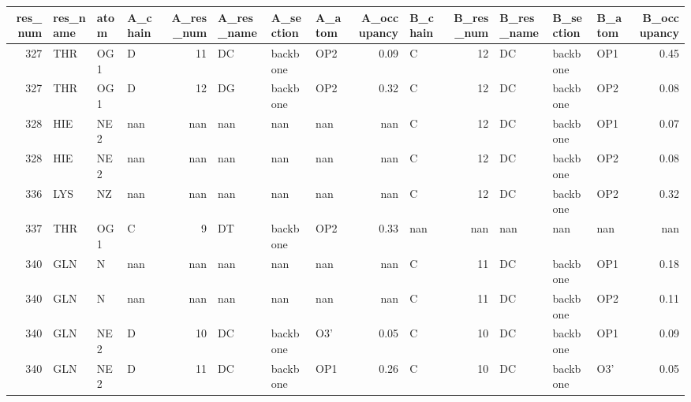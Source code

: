 \begin{longtable}{rlllrlllrlrlllr}
\hline
   res\_num & res\_name   & atom   & A\_chain   &   A\_res\_num & A\_res\_name   & A\_section   & A\_atom   &   A\_occupancy & B\_chain   &   B\_res\_num & B\_res\_name   & B\_section   & B\_atom   &   B\_occupancy \\
\hline
\endhead
       327 & THR        & OG1    & D         &          11 & DC           & backbone    & OP2      &          0.09 & C         &          12 & DC           & backbone    & OP1      &          0.45 \\
       327 & THR        & OG1    & D         &          12 & DG           & backbone    & OP2      &          0.32 & C         &          12 & DC           & backbone    & OP2      &          0.08 \\
       328 & HIE        & NE2    & nan       &         nan & nan          & nan         & nan      &        nan    & C         &          12 & DC           & backbone    & OP1      &          0.07 \\
       328 & HIE        & NE2    & nan       &         nan & nan          & nan         & nan      &        nan    & C         &          12 & DC           & backbone    & OP2      &          0.08 \\
       336 & LYS        & NZ     & nan       &         nan & nan          & nan         & nan      &        nan    & C         &          12 & DC           & backbone    & OP2      &          0.32 \\
       337 & THR        & OG1    & C         &           9 & DT           & backbone    & OP2      &          0.33 & nan       &         nan & nan          & nan         & nan      &        nan    \\
       340 & GLN        & N      & nan       &         nan & nan          & nan         & nan      &        nan    & C         &          11 & DC           & backbone    & OP1      &          0.18 \\
       340 & GLN        & N      & nan       &         nan & nan          & nan         & nan      &        nan    & C         &          11 & DC           & backbone    & OP2      &          0.11 \\
       340 & GLN        & NE2    & D         &          10 & DC           & backbone    & O3'      &          0.05 & C         &          10 & DC           & backbone    & OP1      &          0.09 \\
       340 & GLN        & NE2    & D         &          11 & DC           & backbone    & OP1      &          0.26 & C         &          10 & DC           & backbone    & O3'      &          0.05 \\

\end{longtable}
